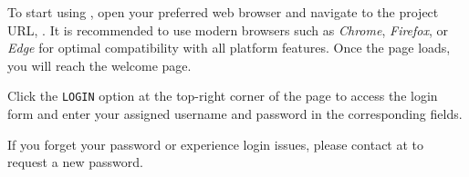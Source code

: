  

To start using \app, open your preferred web browser and navigate to the project URL, \prjUrl. It is recommended to use modern browsers such as \textsl{Chrome}, \textsl{Firefox}, or \textsl{Edge} for optimal compatibility with all platform features. Once the page loads, you will reach the welcome page. 

\vspace{0.5cm}


Click the \texttt{LOGIN} option at the top-right corner of the page to access the login form and enter your assigned username and password in the corresponding fields. 

\rolecontent{\role}
{%
}
{%
}
{%
}

If you forget your password or experience login issues, please contact \textsl{\prjContact} at \prjGuaix to request a new password.

